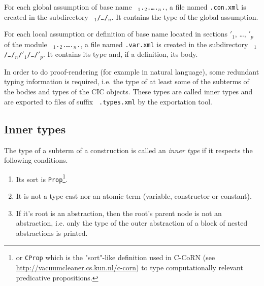 For each global assumption of base name {\tt
{\ident$_1$}.{\ident$_2$}.{\ldots}.{\ident$_n$}.{\ident}}, a file
named {\tt {\ident}.con.xml} is created in the subdirectory {\tt
{\ident$_1$}/{\ldots}/{\ident$_n$}}.  It contains the type of the
global assumption.

For each local assumption or definition of base name {\ident} located
in sections {\ident$'_1$}, {\ldots}, {\ident$'_p$} of the module {\tt
{\ident$_1$}.{\ident$_2$}.{\ldots}.{\ident$_n$}.{\ident}}, a file
named {\tt {\ident}.var.xml} is created in the subdirectory {\tt
{\ident$_1$}/{\ldots}/{\ident$_n$}/{\ident$'_1$}/\ldots/{\ident$'_p$}}.
It contains its type and, if a definition, its body.

In order to do proof-rendering (for example in natural language), some
redundant typing information is required, i.e. the type of at least
some of the subterms of the bodies and types of the CIC objects. These
types are called inner types and are exported to files of suffix {\tt
.types.xml} by the exportation tool.




\subsection[Inner types]{Inner types\label{inner-types}}

The type of a subterm of a construction is called an {\em inner type}
if it respects the following conditions.
 
\begin{enumerate}
  \item Its sort is \verb+Prop+\footnote{or {\tt CProp} which is the
    "sort"-like definition used in C-CoRN (see
    \url{http://vacuumcleaner.cs.kun.nl/c-corn}) to type
    computationally relevant predicative propositions.}.
 \item It is not a type cast nor an atomic term (variable, constructor or constant).
 \item If it's root is an abstraction, then the root's parent node is
    not an abstraction, i.e. only the type of the outer abstraction of
    a block of nested abstractions is printed.
\end{enumerate}
                                                                               
